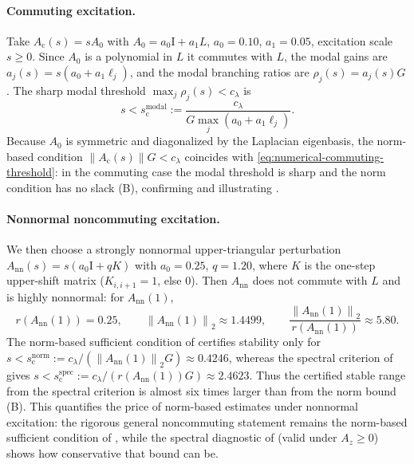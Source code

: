 \documentclass[11pt]{article}
\theoremstyle{plain}
\theoremstyle{definition}
\theoremstyle{remark}
\newcommand{\norm}[1]{\left\lVert #1 \right\rVert}
\newcommand{\branch}{\rho}
\newcommand{\id}{\mathrm{I}}
\begin{document}
\paragraph{Commuting excitation.}
Take $A_{\mathrm c}(s)=sA_0$ with $A_0=a_0\id+a_1L$, $a_0=0.10$, $a_1=0.05$, excitation scale
$s\ge0$. Since $A_0$ is a polynomial in $L$ it commutes with $L$, the modal gains are
$a_j(s)=s(a_0+a_1\ell_j)$, and the modal branching ratios are $\branch_j(s)=a_j(s)G$. The sharp
modal threshold $\max_j\branch_j(s)<c_\lambda$ is
\begin{equation}
    s<s_{\mathrm c}^{\mathrm{modal}}
    :=
    \frac{c_\lambda}{G\max_j(a_0+a_1\ell_j)} .
    \label{eq:numerical-commuting-threshold}
\end{equation}
Because $A_0$ is symmetric and diagonalized by the Laplacian eigenbasis, the norm-based condition
$\norm{A_{\mathrm c}(s)}G<c_\lambda$ coincides with \eqref{eq:numerical-commuting-threshold}: in
the commuting case the modal threshold is sharp and the norm condition has no slack
(B), confirming  and illustrating
.

\paragraph{Nonnormal noncommuting excitation.}
We then choose a strongly nonnormal upper-triangular perturbation
$A_{\mathrm{nn}}(s)=s(a_0\id+qK)$ with $a_0=0.25$, $q=1.20$, where $K$ is the one-step upper-shift
matrix ($K_{i,i+1}=1$, else $0$). Then $A_{\mathrm{nn}}$ does not commute with $L$ and is highly
nonnormal: for $A_{\mathrm{nn}}(1)$,
\begin{equation}
    r(A_{\mathrm{nn}}(1))=0.25,
    \qquad
    \norm{A_{\mathrm{nn}}(1)}_2\approx 1.4499,
    \qquad
    \frac{\norm{A_{\mathrm{nn}}(1)}_2}{r(A_{\mathrm{nn}}(1))}\approx 5.80 .
    \label{eq:numerical-nonnormal-gap}
\end{equation}
The norm-based sufficient condition of  certifies stability only for
$s<s_{\mathrm c}^{\mathrm{norm}}:=c_\lambda/(\norm{A_{\mathrm{nn}}(1)}_2G)\approx0.4246$, whereas
the spectral criterion of  gives
$s<s_{\mathrm c}^{\mathrm{spec}}:=c_\lambda/(r(A_{\mathrm{nn}}(1))G)\approx2.4623$. Thus the
certified stable range from the spectral criterion is almost six times larger than from the norm
bound (B). This quantifies the price of norm-based estimates under
nonnormal excitation: the rigorous general noncommuting statement remains the norm-based sufficient
condition of , while the spectral diagnostic of 
(valid under $A_z\ge0$) shows how conservative that bound can be.
\end{document}
